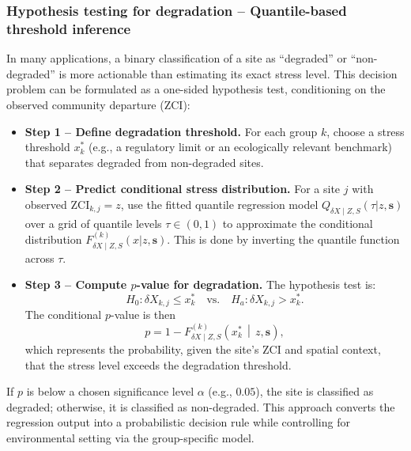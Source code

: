 \subsubsection{Hypothesis testing for degradation -- Quantile-based threshold inference}

In many applications, a binary classification of a site as ``degraded'' or ``non-degraded'' 
is more actionable than estimating its exact stress level. 
This decision problem can be formulated as a one-sided hypothesis test, conditioning on the 
observed community departure (ZCI):

\begin{itemize}
    \item \textbf{Step 1 -- Define degradation threshold.}  
    For each group $k$, choose a stress threshold $x_{k}^*$ 
    (e.g., a regulatory limit or an ecologically relevant benchmark) 
    that separates degraded from non-degraded sites.

    \item \textbf{Step 2 -- Predict conditional stress distribution.}  
    For a site $j$ with observed $\mathrm{ZCI}_{k,j}=z$, 
    use the fitted quantile regression model 
    ${Q}_{\delta X\mid Z,S}(\tau | z, \mathbf{s})$ over a grid of quantile levels 
    $\tau \in (0,1)$ to approximate the conditional distribution 
    $F_{\delta X\mid Z, S}^{(k)}(x | z, \mathbf{s})$. 
    This is done by inverting the quantile function across $\tau$.

    \item \textbf{Step 3 -- Compute $p$-value for degradation.}  
    The hypothesis test is:
    \[
    H_0: \delta X_{k,j} \le x_{k}^* \quad \text{vs.} \quad H_a: \delta X_{k,j} > x_{k}^* .
    \]
    The conditional $p$-value is then
    \[
    p = 1 - F_{\delta X\mid Z,S}^{(k)}\!\left( x_{k}^* \,\middle|\, z, \mathbf{s} \right),
    \]
    which represents the probability, given the site's ZCI and spatial context, that the stress level 
    exceeds the degradation threshold.
\end{itemize}

If $p$ is below a chosen significance level $\alpha$ (e.g., $0.05$), 
the site is classified as degraded; otherwise, it is classified as non-degraded.  
This approach converts the regression output into a probabilistic decision rule while 
controlling for environmental setting via the group-specific model.

